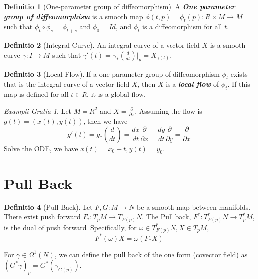 \documentclass[12pt, a4paper]{article}
\theoremstyle{definition}
\newtheorem{definition}{Definitio}[section]
\theoremstyle{remark}
\newtheorem{example}{Exampli Gratia}[section]
\renewcommand{\emph}[1]{\textbf{\textit{#1}}}
\begin{document}
\begin{definition}[One-parameter group of diffeomorphism]
	A \emph{One parameter group of diffeomorphism} is a smooth map $\phi(t, p) = \phi_t(p): R \times M \rightarrow M$ such that $\phi_t \circ \phi_s = \phi_{t+s}$ and $\phi_0 = Id$, and $\phi_t$ is a diffeomorphism for all $t$.
\end{definition}

\begin{definition}[Integral Curve]
	An integral curve of a vector field $X$ is a smooth curve $\gamma: I \rightarrow M$ such that $\gamma'(t) = \gamma_*(\frac{d}{dt})\rvert_p = X_{\gamma(t)}$.
\end{definition}

\begin{definition}[Local Flow]
	If a one-parameter group of diffeomorphism $\phi_t$ exists that is the integral curve of a vector field $X$, then $X$ is a \emph{local flow} of $\phi_t$. 
	If this map is defined for all $t \in R$, it is a global flow.
\end{definition}

\begin{example}
	Let $M = R^2$ and $X = \frac{\partial }{\partial x}$. Assuming the flow is $g(t) = (x(t), y(t))$, then we have 
	\[
		g'(t) = g_*(\frac{d}{dt}) = \frac{dx}{dt} \frac{\partial }{\partial x} + \frac{dy}{dt} \frac{\partial }{\partial y} =  \frac{\partial }{\partial x}
		\]
	Solve the ODE, we have $x(t) = x_0 + t, y(t) = y_0$.
\end{example}

\section{Pull Back}

\begin{definition}[Pull Back]
	Let $F, G: M \rightarrow N$ be a smooth map between manifolds. 
	There exist push forward $F_*: T_pM \rightarrow T_{F(p)}N$. The Pull back, $F^*: T_{F(p)}^*N \rightarrow T_{p}^*M$, is the dual of push forward.
	Specifically, for $\omega \in T_{F(p)}^*N, X \in T_pM$,
	$$
	F^*(\omega) X = \omega(F_*X)
	$$

	For $\gamma \in \Omega^1(N)$, we can define the pull back of the one form (covector field) as $(G^* \gamma)_p = G^*(\gamma_{G(p)})$.

\end{definition}
\end{document}
